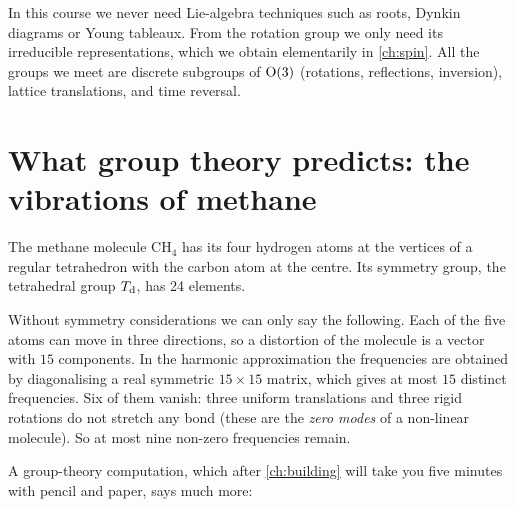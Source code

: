 \begin{center}
\end{center}

In this course we never need Lie-algebra techniques such as roots, Dynkin diagrams
or Young tableaux. From the rotation group we only need its irreducible representations,
which we obtain elementarily in \cref{ch:spin}. All the groups we meet are discrete
subgroups of $\mathrm{O}(3)$ (rotations, reflections, inversion), lattice translations, and
time reversal.

\section{What group theory predicts: the vibrations of methane}\label{sec:methane}

The methane molecule $\mathrm{CH_4}$ has its four hydrogen atoms at the vertices of a
regular tetrahedron with the carbon atom at the centre. Its symmetry group, the
tetrahedral group $T_{\mathrm{d}}$, has 24 elements.

Without symmetry considerations we can only say the following. Each of the five
atoms can move in three directions, so a distortion of the molecule is a vector with
$15$ components. In the harmonic approximation the frequencies are obtained by
diagonalising a real symmetric $15\times15$ matrix, which gives at most $15$ distinct
frequencies. Six of them vanish: three uniform translations and three rigid
rotations do not stretch any bond (these are the \emph{zero modes} of a non-linear
molecule). So at most nine non-zero frequencies remain.

A group-theory computation, which after \cref{ch:building} will take you five minutes
with pencil and paper, says much more:

